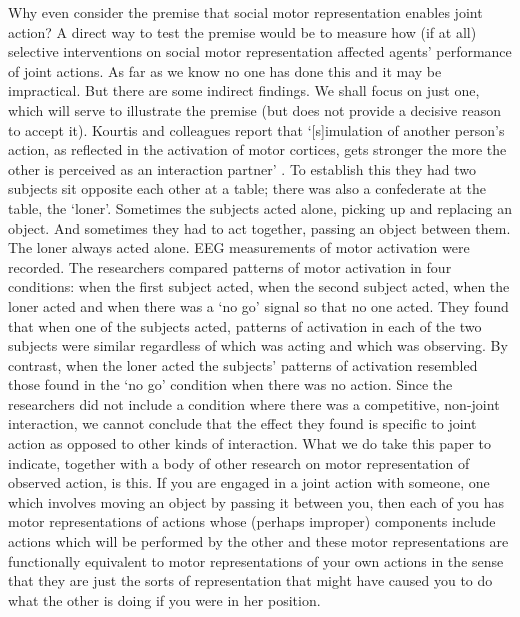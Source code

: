 \documentclass[12pt,\papersize]{extarticle}
\begin{document}
Why even consider the premise that social motor representation enables joint action?
A direct way to test the premise would be to 
measure how (if at all) selective interventions on social motor representation affected agents’ performance of joint actions.
As far as we know no one has done this and it may be impractical.
But there are some indirect findings.
We shall focus on just one, which will serve to illustrate the premise (but does not provide a decisive reason to accept it).
Kourtis and colleagues report that `[s]imulation of another person’s action, as reflected in the activation of motor cortices, gets stronger the more the other is perceived as an interaction partner’  \citep[p.\ 4]{kourtis:2010_favoritism}.
To establish this they had two subjects sit opposite each other at a table; there was also a confederate at the table, the `loner'.  
Sometimes the subjects acted alone, picking up and replacing an object.  And sometimes they had to act together, passing an object between them.  
The loner always acted alone.
EEG measurements of motor activation were recorded.
The researchers compared patterns of motor activation in four conditions: when the first subject acted, when the second subject acted, when the loner acted and when there was a `no go' signal so that no one acted.
They found that when one of the subjects acted, patterns of activation in each of the two subjects were similar regardless of which was acting and which was observing.
By contrast, when the loner acted the subjects' patterns of activation resembled those found in the `no go' condition when there was no action.
Since the researchers did not include a condition where there was a competitive, non-joint interaction, we cannot conclude that the effect they found is specific to joint action as opposed to other kinds of interaction.
What we do take this paper to indicate, 
together with a body of other research on motor representation of observed action,
is this.
If you are engaged in a joint action with someone, one which involves moving an object by passing it between you, then each of you has motor representations of actions whose (perhaps improper) components include actions which will be performed by the other  and these motor representations are functionally equivalent to motor representations of your own actions in the sense that they are just the sorts of representation that might have caused you to do what the other is doing if you were in her position.
\end{document}
